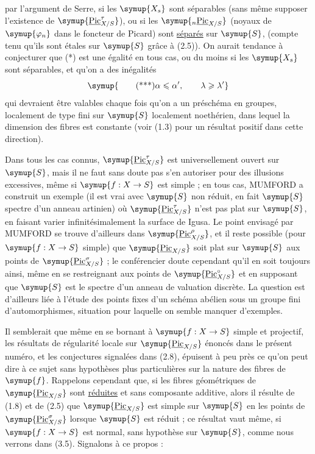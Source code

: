 par l'argument de Serre, si les $\symup{X_s}$ sont séparables (sans même supposer
l'existence de $\symup{\underline{\operatorname{Pic}}_{X/S}^\tau}$), ou si les
$\symup{{}_n\underline{\operatorname{Pic}}_{X/S}}$ (noyaux de $\symup{\varphi_n}$ dans le foncteur de
Picard) sont \uline{séparés} sur $\symup{S}$, (compte tenu
qu'ils sont étales sur $\symup{S}$ grâce à (2.5)). On aurait tendance à conjecturer que (*) est une égalité en tous cas,
ou du moins si les $\symup{X_s}$ sont séparables, et qu'on a des inégalités
\[
\symup{\tag{***}\alpha\leqslant\alpha',\qquad\lambda\geqslant\lambda'}
\]
qui devraient être valables chaque fois qu'on a un préschéma en groupes,
localement de type fini sur $\symup{S}$ localement noethérien, dans lequel la dimension
des fibres est constante (voir (1.3) pour un résultat positif dans cette
direction).

 Dans tous les cas connus,
$\symup{\underline{\operatorname{Pic}}_{X/S}^\tau}$ est universellement ouvert sur $\symup{S}$, mais il ne
faut sans doute pas s'en autoriser pour des illusions excessives, même si
$\symup{f:X\to S}$ est simple ; en tous cas, MUMFORD a construit un
exemple (il est vrai avec $\symup{S}$ non réduit, en fait $\symup{S}$ spectre d'un anneau
artinien) où $\symup{\underline{\operatorname{Pic}}_{X/S}^\tau}$ n'est pas plat sur $\symup{S}$, en faisant
varier infinitésimalement la surface de Igusa. Le point envisagé par MUMFORD se
trouve d'ailleurs dans $\symup{\underline{\operatorname{Pic}}_{X/S}^\rho}$, et il reste possible
(pour $\symup{f:X\to S}$ simple) que $\symup{\underline{\operatorname{Pic}}_{X/S}}$ soit
plat sur $\symup{S}$ aux points de $\symup{\underline{\operatorname{Pic}}_{X/S}^\sigma}$ ; le conférencier
doute cependant qu'il en soit toujours ainsi, même en se restreignant aux
points de $\symup{\underline{\operatorname{Pic}}_{X/S}^\circ}$ et en supposant que $\symup{S}$ est le
spectre d'un anneau de valuation discrète. La question est d'ailleurs liée à
l'étude des points fixes d'un schéma abélien sous un groupe fini
d'automorphismes, situation pour laquelle on semble manquer d'exemples.

Il semblerait que même en se bornant à $\symup{f:X\to S}$ simple et
projectif, les résultats de régularité locale sur $\symup{\underline{\operatorname{Pic}}_{X/S}}$
énoncés dans le présent numéro, et les conjectures signalées dans (2.8),
épuisent à peu près ce qu'on peut dire à ce sujet sans hypothèses plus
particulières sur la nature des fibres de $\symup{f}$. Rappelons cependant que, si les
fibres géométriques de $\symup{\underline{\operatorname{Pic}}_{X/S}}$ sont \uline{réduites} et sans
composante additive, alors il résulte de (1.8) et de (2.5) que
$\symup{\underline{\operatorname{Pic}}_{X/S}}$ est simple sur $\symup{S}$ en les points de
$\symup{\underline{\operatorname{Pic}}_{X/S}^\sigma}$ lorsque $\symup{S}$ est réduit ; ce résultat vaut
même, si $\symup{f:X\to S}$ est normal, sans hypothèse sur $\symup{S}$, comme nous
verrons dans (3.5). Signalons à ce propos :


